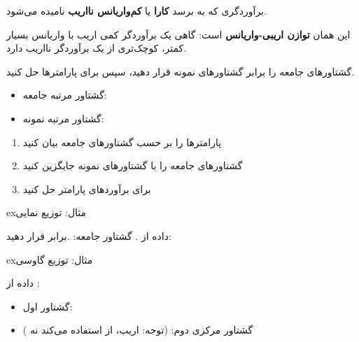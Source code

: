 برآوردگری که به  برسد \textbf{کارا} یا \textbf{کم‌واریانس نااریب } نامیده می‌شود.




این همان \textbf{توازن اریبی-واریانس} است: گاهی یک برآوردگر کمی اریب با واریانس بسیار کمتر،  کوچک‌تری از یک برآوردگر نااریب دارد.



گشتاورهای جامعه را برابر گشتاورهای نمونه قرار دهید، سپس برای پارامترها حل کنید.

\begin{itemize}
\tightlist
\item
  گشتاور مرتبه  جامعه: 
\item
  گشتاور مرتبه  نمونه: 
\end{itemize}


\begin{enumerate}
\def\labelenumi{\arabic{enumi}.}
\tightlist
\item
  پارامترها را بر حسب گشتاورهای جامعه بیان کنید
\item
  گشتاورهای جامعه را با گشتاورهای نمونه جایگزین کنید
\item
  برای برآوردهای پارامتر حل کنید
\end{enumerate}

\begin{PSbox}[unbreakable]{ex}{مثال: توزیع نمایی}

داده از . گشتاور جامعه: .\PSbr{}برابر قرار دهید: 

\end{PSbox}

\begin{PSbox}[unbreakable]{ex}{مثال: توزیع گاوسی}

داده از :

\begin{itemize}
\tightlist
\item
  گشتاور اول: 
\item
  گشتاور مرکزی دوم:  (توجه: اریب، از  استفاده می‌کند نه )
\end{itemize}

\end{PSbox}

